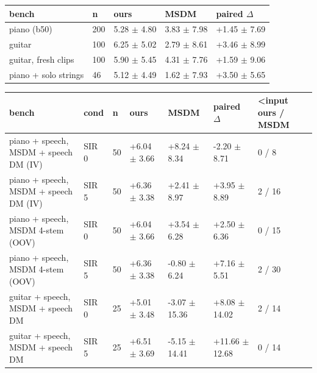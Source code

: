 \begin{tabular}{lllll}
\toprule
bench & n & ours & MSDM & paired $\Delta$\\
\midrule
piano (b50) & 200 & 5.28 $\pm$ 4.80 & 3.83 $\pm$ 7.98 & +1.45 $\pm$ 7.69\\
guitar & 100 & 6.25 $\pm$ 5.02 & 2.79 $\pm$ 8.61 & +3.46 $\pm$ 8.99\\
guitar, fresh clips & 100 & 5.90 $\pm$ 5.45 & 4.31 $\pm$ 7.76 & +1.59 $\pm$ 9.06\\
piano + solo strings & 46 & 5.12 $\pm$ 4.49 & 1.62 $\pm$ 7.93 & +3.50 $\pm$ 5.65\\
\bottomrule
\end{tabular}

\begin{tabular}{lllllll}
\toprule
bench & cond & n & ours & MSDM & paired $\Delta$ & <input ours / MSDM\\
\midrule
piano + speech, MSDM + speech DM (IV) & SIR 0 & 50 & +6.04 $\pm$ 3.66 & +8.24 $\pm$ 8.34 & -2.20 $\pm$ 8.71 & 0 / 8\\
piano + speech, MSDM + speech DM (IV) & SIR 5 & 50 & +6.36 $\pm$ 3.38 & +2.41 $\pm$ 8.97 & +3.95 $\pm$ 8.89 & 2 / 16\\
piano + speech, MSDM 4-stem (OOV) & SIR 0 & 50 & +6.04 $\pm$ 3.66 & +3.54 $\pm$ 6.28 & +2.50 $\pm$ 6.36 & 0 / 15\\
piano + speech, MSDM 4-stem (OOV) & SIR 5 & 50 & +6.36 $\pm$ 3.38 & -0.80 $\pm$ 6.24 & +7.16 $\pm$ 5.51 & 2 / 30\\
guitar + speech, MSDM + speech DM & SIR 0 & 25 & +5.01 $\pm$ 3.48 & -3.07 $\pm$ 15.36 & +8.08 $\pm$ 14.02 & 2 / 14\\
guitar + speech, MSDM + speech DM & SIR 5 & 25 & +6.51 $\pm$ 3.69 & -5.15 $\pm$ 14.41 & +11.66 $\pm$ 12.68 & 0 / 14\\
\bottomrule
\end{tabular}
